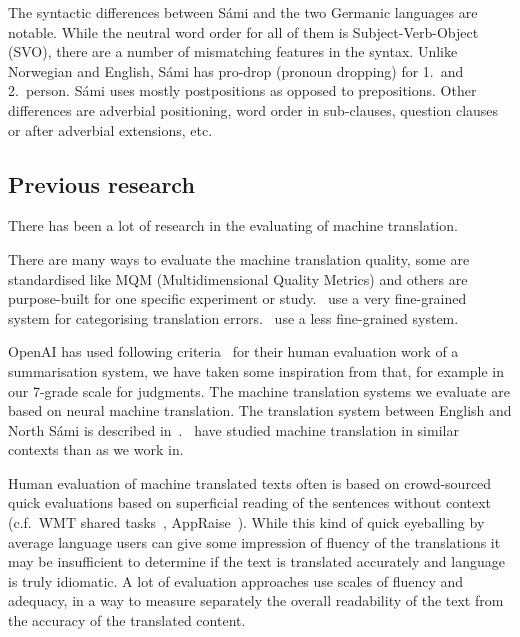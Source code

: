\documentclass{flammie}
\begin{document}
The syntactic differences between Sámi and the two Germanic languages are
notable. While the neutral word order for all of them is Subject-Verb-Object
(SVO), there are a number of mismatching features in the syntax. Unlike
Norwegian and English, Sámi has pro-drop (pronoun dropping) for 1.\ and 2.\
person. Sámi uses mostly postpositions as opposed to prepositions. Other
differences are adverbial positioning, word order in sub-clauses, question
clauses or after adverbial extensions, etc.


\subsection{Previous research}




There has been a lot of research in the evaluating of machine translation.

There are many ways to evaluate the machine translation quality, some are
standardised like MQM (Multidimensional Quality Metrics) and others are
purpose-built for one specific experiment or study.~\cite{Lommel2018metrics} use
a very fine-grained system for categorising translation
errors.~\cite{Popovic2018error} use a less fine-grained system.

OpenAI has used following criteria~\cite{stiennon2020learning} for their human
evaluation work of a summarisation system, we have taken some inspiration from
that, for example in our 7-grade scale for judgments.  The machine translation
systems we evaluate are based on neural machine translation.  The translation
system between English and North Sámi is described
in~\cite{yankovskaya-etal-2023-machine}.~\cite{mager2023ethical} have studied
machine translation in similar contexts than as we work in.

Human evaluation of machine translated texts often is based on crowd-sourced
quick evaluations based on superficial reading of the sentences without context
(c.f.\ WMT shared tasks~\cite{weller-di-marco-fraser-2022-findings},
AppRaise~\cite{federmann-2018-appraise}).  While this kind of quick eyeballing
by average language users can give some impression of fluency of the
translations it may be insufficient to determine if the text is translated
accurately and language is truly idiomatic.  A lot of evaluation approaches use
scales of fluency and adequacy, in a way to measure separately the overall
readability of the text from the accuracy of the translated content.
\end{document}
